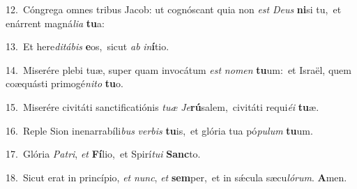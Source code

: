 {\numbfont\textcolor{\numbcolor}{12.}}~Cóngrega omnes tribus Jacob: ut cognóscant quia non \textit{est} \textit{De}\-\textit{us} \textbf{ni}\-si tu,~\star et enárrent magná\-\textit{li}\-\textit{a} \textbf{tu}\-a:\par
{\numbfont\textcolor{\numbcolor}{13.}}~Et here\-\textit{di}\-\textit{tá}\textit{bis} \textbf{e}\-os,~\star sicut \textit{ab} \textit{in}\-\textbf{í}tio.\par
{\numbfont\textcolor{\numbcolor}{14.}}~Miserére plebi tuæ, super quam invocátum \textit{est} \textit{no}\-\textit{men} \textbf{tu}\-um:~\star et Israël, quem coæquásti primogé\-\textit{ni}\-\textit{to} \textbf{tu}\-o.\par
{\numbfont\textcolor{\numbcolor}{15.}}~Miserére civitáti sanctificatiónis \textit{tu}\-\textit{æ} \textit{Je}\-\textbf{rú}salem,~\star civitáti requi\-\textit{é}\-\textit{i} \textbf{tu}\-æ.\par
{\numbfont\textcolor{\numbcolor}{16.}}~Reple Sion inenarrabíli\textit{bus} \textit{ver}\-\textit{bis} \textbf{tu}\-is,~\star et glória tua pó\-\textit{pu}\-\textit{lum} \textbf{tu}\-um.\par
{\numbfont\textcolor{\numbcolor}{17.}}~Glória \textit{Pa}\-\textit{tri}, \textit{et} \textbf{Fí}\-lio,~\star et Spirí\-\textit{tu}\-\textit{i} \textbf{Sanc}\-to.\par
{\numbfont\textcolor{\numbcolor}{18.}}~Sicut erat in princípio, \textit{et} \textit{nunc}\-, \textit{et} \textbf{sem}\-per,~\star et in sǽcula sæcu\-\textit{ló}\-\textit{rum}. \textbf{A}\-men.\par
